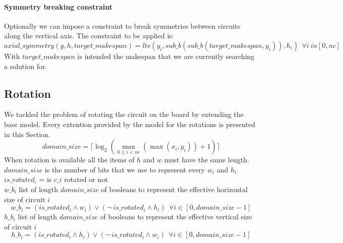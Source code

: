 
    \paragraph*{Symmetry breaking constraint}
    Optionally we can impose a constraint to break symmetries between circuits along the vertical axis.
    The constraint to be applied is:
    \begin{equation}
      axial\_symmetry(y, h, target\_makespan) = lte(y_i, sub\_b(sub\_b(target\_makespan, y_i)), h_i) \ \ \forall i \ in [0, nc]
    \end{equation}
    With \(target\_makespan\) is intended the makespan that we are currently searching a solution for.


\subsection{Rotation}\label{subsec:SAT_rotation}
  We tackled the problem of rotating the circuit on the board by extending the base model. Every
  extention provided by the model for the rotations is presented in this Section.\\
  \begin{equation}
    domain\_size = \lceil \log_2 (\max_{0 \leq i < nc} (\max(x_i, y_i)) + 1) \rceil
  \end{equation}
  When rotation is available all the items of \(h\) and \(w\) must have the same length.
  \(domain\_size \) is the number of bits that we use to represent every \(w_i\) and \(h_i\)\\
    \(is\_rotated_i\) = is \(c\_i\) rotated or not\\
  \(w\_b_i\) list of length \(domain\_size \) of booleans to represent the effective horizontal size of circuit \(i\)
  \begin{equation}
    w\_b_i = (is\_rotated_i \land w_i) \lor (\neg \ is\_rotated_i \land h_i) \ \ \forall i \in [0, domain\_size-1] 
  \end{equation}
  \(h\_b_i\) list of length \(domain\_size \) of booleans to represent the effective vertical size of circuit \(i\)
  \begin{equation}
    h\_b_i = (is\_rotated_i \land h_i) \lor (\neg \ is\_rotated_i \land w_i) \ \ \forall i \in [0, domain\_size-1] 
  \end{equation}  


